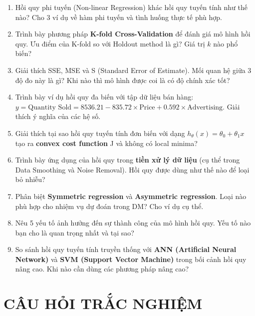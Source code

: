 \documentclass[10pt]{article}
\begin{document}
\begin{enumerate}[leftmargin=*, label=\textbf{Câu \arabic*.}]
    \item Hồi quy phi tuyến (Non-linear Regression) khác hồi quy tuyến tính như thế nào? Cho 3 ví dụ về hàm phi tuyến và tình huống thực tế phù hợp.

    \item Trình bày phương pháp \textbf{K-fold Cross-Validation} để đánh giá mô hình hồi quy. Ưu điểm của K-fold so với Holdout method là gì? Giá trị $k$ nào phổ biến?

    \item Giải thích SSE, MSE và S (Standard Error of Estimate). Mối quan hệ giữa 3 độ đo này là gì? Khi nào thì mô hình được coi là có độ chính xác tốt?

    \item Trình bày ví dụ hồi quy đa biến với tập dữ liệu bán hàng: $y = \text{Quantity Sold} = 8536.21 - 835.72 \times \text{Price} + 0.592 \times \text{Advertising}$. Giải thích ý nghĩa của các hệ số.

    \item Giải thích tại sao hồi quy tuyến tính đơn biến với dạng $h_\theta(x) = \theta_0 + \theta_1 x$ tạo ra \textbf{convex cost function} J và không có local minima?

    \item Trình bày ứng dụng của hồi quy trong \textbf{tiền xử lý dữ liệu} (cụ thể trong Data Smoothing và Noise Removal). Hồi quy được dùng như thế nào để loại bỏ nhiễu?

    \item Phân biệt \textbf{Symmetric regression} và \textbf{Asymmetric regression}. Loại nào phù hợp cho nhiệm vụ dự đoán trong DM? Cho ví dụ cụ thể.

    \item Nêu 5 yếu tố ảnh hưởng đến sự thành công của mô hình hồi quy. Yếu tố nào bạn cho là quan trọng nhất và tại sao?

    \item So sánh hồi quy tuyến tính truyền thống với \textbf{ANN (Artificial Neural Network)} và \textbf{SVM (Support Vector Machine)} trong bối cảnh hồi quy nâng cao. Khi nào cần dùng các phương pháp nâng cao?

\end{enumerate}

\newpage
\section{CÂU HỎI TRẮC NGHIỆM}
\end{document}
